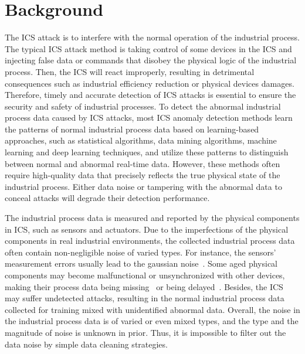 \section{Background}
\label{sec:background}
 The ICS attack is to interfere with the normal operation of the industrial process. The typical ICS attack method is taking control of some devices in the ICS and injecting false data or commands that disobey the physical logic of the industrial process. Then, the ICS will react improperly, resulting in detrimental consequences such as industrial efficiency reduction or physical devices damages. Therefore, timely and accurate detection of ICS attacks is essential to ensure the security and safety of industrial processes. To detect the abnormal industrial process data caused by ICS attacks, most ICS anomaly detection methods learn the patterns of normal industrial process data based on learning-based approaches, such as statistical algorithms, data mining algorithms, machine learning and deep learning techniques, and utilize these patterns to distinguish between normal and abnormal real-time data. However, these methods often require high-quality data that precisely reflects the true physical state of the industrial process. Either data noise or tampering with the abnormal data to conceal attacks will degrade their detection performance.

The industrial process data is measured and reported by the physical components in ICS, such as sensors and actuators.
Due to the imperfections of the physical components in real industrial environments, the collected industrial process data often contain non-negligible noise of varied types. For instance, the sensors' measurement errors usually lead to the gaussian noise~\cite{ahmed2018noise,ahmed2018noiseprint,lee2016deep}. Some aged physical components may become malfunctional or unsynchronized with other devices, making their process data being missing~\cite{li2022remaining,purohit2019mimii} or being delayed~\cite{el2023localizing,manousakis2018hybrid,zhang2018multiple}. Besides, the ICS may suffer undetected attacks, resulting in the normal industrial process data collected for training mixed with unidentified abnormal data. Overall, the noise in the industrial process data is of varied or even mixed types, and the type and the magnitude of noise is unknown in prior. Thus, it is impossible to filter out the data noise by simple data cleaning strategies.

